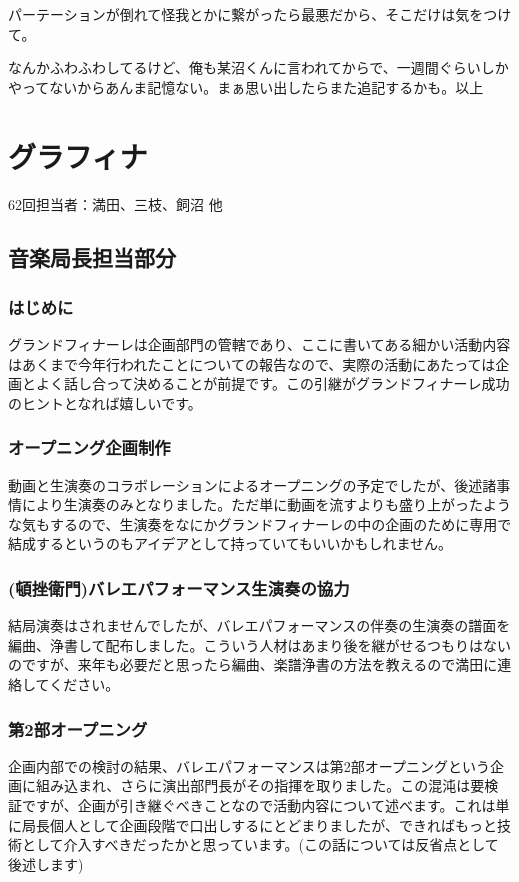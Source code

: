 \documentclass[dvipdfmx,jb5]{jarticle}
\begin{document}
パーテーションが倒れて怪我とかに繋がったら最悪だから、そこだけは気をつけて。

なんかふわふわしてるけど、俺も某沼くんに言われてからで、一週間ぐらいしかやってないからあんま記憶ない。まぁ思い出したらまた追記するかも。以上




 \section{グラフィナ}\label{sec:グラフィナ}
62回担当者：満田、三枝、飼沼 他
\subsection{音楽局長担当部分}
\subsubsection{はじめに}
グランドフィナーレは企画部門の管轄であり、ここに書いてある細かい活動内容はあくまで今年行われたことについての報告なので、実際の活動にあたっては企画とよく話し合って決めることが前提です。この引継がグランドフィナーレ成功のヒントとなれば嬉しいです。
\subsubsection{オープニング企画制作}
動画と生演奏のコラボレーションによるオープニングの予定でしたが、後述諸事情により生演奏のみとなりました。ただ単に動画を流すよりも盛り上がったような気もするので、生演奏をなにかグランドフィナーレの中の企画のために専用で結成するというのもアイデアとして持っていてもいいかもしれません。
\subsubsection{(頓挫衛門)バレエパフォーマンス生演奏の協力}
結局演奏はされませんでしたが、バレエパフォーマンスの伴奏の生演奏の譜面を編曲、浄書して配布しました。こういう人材はあまり後を継がせるつもりはないのですが、来年も必要だと思ったら編曲、楽譜浄書の方法を教えるので満田に連絡してください。
\subsubsection{第2部オープニング}
企画内部での検討の結果、バレエパフォーマンスは第2部オープニングという企画に組み込まれ、さらに演出部門長がその指揮を取りました。この混沌は要検証ですが、企画が引き継ぐべきことなので活動内容について述べます。これは単に局長個人として企画段階で口出しするにとどまりましたが、できればもっと技術として介入すべきだったかと思っています。(この話については反省点として後述します)
\end{document}
